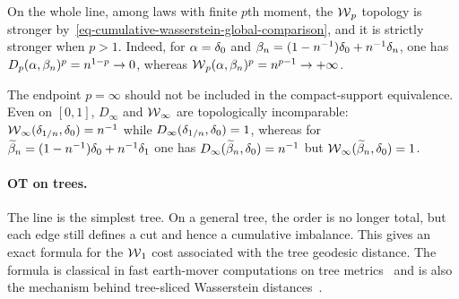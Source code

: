 On the whole line, among laws with finite $p$th moment, the $\operatorname{\mathcal{W}}_p$ topology is stronger by~\eqref{eq-cumulative-wasserstein-global-comparison}, and it is strictly stronger when $p>1$. Indeed, for $\alpha=\delta_0$ and $\beta_n=(1-n^{-1})\delta_0+n^{-1}\delta_n$, one has $D_p(\alpha,\beta_n)^p=n^{1-p}\to0$, whereas $\operatorname{\mathcal{W}}_p(\alpha,\beta_n)^p=n^{p-1}\to+\infty$.

The endpoint $p=\infty$ should not be included in the compact-support equivalence. Even on $[0,1]$, $D_\infty$ and $\operatorname{\mathcal{W}}_\infty$ are topologically incomparable: $\operatorname{\mathcal{W}}_\infty(\delta_{1/n},\delta_0)=n^{-1}$ while $D_\infty(\delta_{1/n},\delta_0)=1$, whereas for $\widetilde{\beta}_n=(1-n^{-1})\delta_0+n^{-1}\delta_1$ one has $D_\infty(\widetilde{\beta}_n,\delta_0)=n^{-1}$ but $\operatorname{\mathcal{W}}_\infty(\widetilde{\beta}_n,\delta_0)=1$.

\paragraph{OT on trees.}

The line is the simplest tree. On a general tree, the order is no longer total, but each edge still defines a cut and hence a cumulative imbalance. This gives an exact formula for the $\operatorname{\mathcal{W}}_1$ cost associated with the tree geodesic distance. The formula is classical in fast earth-mover computations on tree metrics~\cite{TreeEMD2007} and is also the mechanism behind tree-sliced Wasserstein distances~\cite{LeYamadaFukumizuCuturi2019TreeSliced}.

